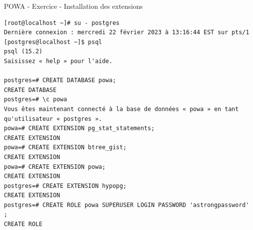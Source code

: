 
\begin{frame}[fragile]{POWA - Exercice - Installation des extensions}

\begin{tiny}
\begin{Verbatim}[commandchars=\&\{\}]
[root@localhost ~]# su - postgres
Dernière connexion : mercredi 22 février 2023 à 13:16:44 EST sur pts/1
[postgres@localhost ~]$ psql
psql (15.2)
Saisissez « help » pour l'aide.

postgres=# CREATE DATABASE powa;
CREATE DATABASE
postgres=# \c powa
Vous êtes maintenant connecté à la base de données « powa » en tant qu'utilisateur « postgres ».
powa=# CREATE EXTENSION pg_stat_statements;
CREATE EXTENSION
powa=# CREATE EXTENSION btree_gist;
CREATE EXTENSION
powa=# CREATE EXTENSION powa;
CREATE EXTENSION
postgres=# CREATE EXTENSION hypopg;
CREATE EXTENSION
postgres=# CREATE ROLE powa SUPERUSER LOGIN PASSWORD 'astrongpassword' ;
CREATE ROLE
\end{Verbatim}
\end{tiny}

\end{frame}


